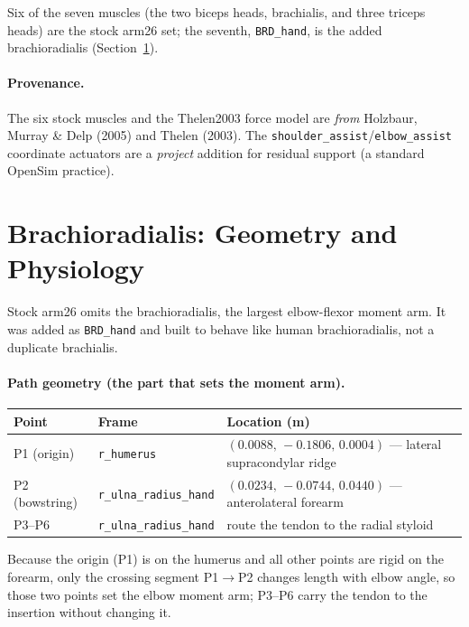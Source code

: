 \documentclass[11pt]{article}
\begin{document}
Six of the seven muscles (the two biceps heads, brachialis, and three triceps
heads) are the stock arm26 set; the seventh, \texttt{BRD\_hand}, is the added
brachioradialis (Section~\ref{sec:brd}).

\paragraph{Provenance.} The six stock muscles and the Thelen2003 force model are
\textit{from} Holzbaur, Murray \& Delp (2005) and Thelen (2003). The
\texttt{shoulder\_assist}/\texttt{elbow\_assist} coordinate actuators are a
\textit{project} addition for residual support (a standard OpenSim practice).

\section{Brachioradialis: Geometry and Physiology}
\label{sec:brd}

Stock arm26 omits the brachioradialis, the largest elbow-flexor moment arm. It
was added as \texttt{BRD\_hand} and built to behave like human brachioradialis,
not a duplicate brachialis.

\paragraph{Path geometry (the part that sets the moment arm).}
\begin{table}[h]
\centering
\begin{tabular}{lll}
\toprule
\textbf{Point} & \textbf{Frame} & \textbf{Location (m)} \\
\midrule
P1 (origin) & \texttt{r\_humerus} & $(0.0088,\,-0.1806,\,0.0004)$ --- lateral supracondylar ridge \\
P2 (bowstring) & \texttt{r\_ulna\_radius\_hand} & $(0.0234,\,-0.0744,\,0.0440)$ --- anterolateral forearm \\
P3--P6 & \texttt{r\_ulna\_radius\_hand} & route the tendon to the radial styloid \\
\bottomrule
\end{tabular}
\end{table}

Because the origin (P1) is on the humerus and all other points are rigid on the
forearm, only the crossing segment P1$\to$P2 changes length with elbow angle, so
those two points set the elbow moment arm; P3--P6 carry the tendon to the
insertion without changing it.
\end{document}
